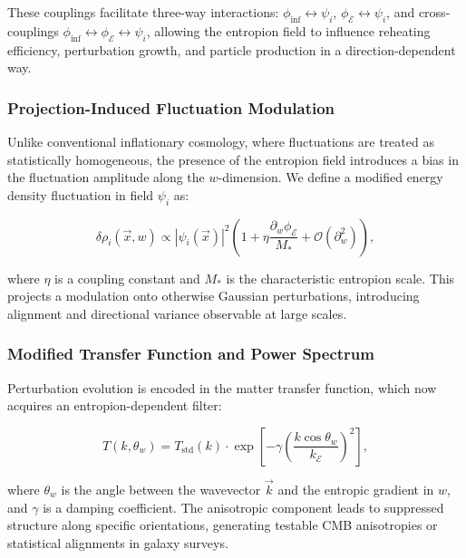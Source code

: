 \documentclass[12pt]{article}
\begin{document}
These couplings facilitate three-way interactions: \(\phi_{\text{inf}} \leftrightarrow \psi_i\), \(\phi_{\mathcal{E}} \leftrightarrow \psi_i\), and cross-couplings \(\phi_{\text{inf}} \leftrightarrow \phi_{\mathcal{E}} \leftrightarrow \psi_i\), allowing the entropion field to influence reheating efficiency, perturbation growth, and particle production in a direction-dependent way.

\subsubsection*{Projection-Induced Fluctuation Modulation}

Unlike conventional inflationary cosmology, where fluctuations are treated as statistically homogeneous, the presence of the entropion field introduces a bias in the fluctuation amplitude along the \(w\)-dimension. We define a modified energy density fluctuation in field \(\psi_i\) as:

\begin{equation}
\label{eq:fluctuation_bias}
\delta \rho_i(\vec{x}, w) \propto \left| \psi_i(\vec{x}) \right|^2 \left( 1 + \eta \frac{\partial_w \phi_{\mathcal{E}}}{M_*} + \mathcal{O}(\partial_w^2) \right),
\end{equation}

where \(\eta\) is a coupling constant and \(M_*\) is the characteristic entropion scale. This projects a modulation onto otherwise Gaussian perturbations, introducing alignment and directional variance observable at large scales.

\subsubsection*{Modified Transfer Function and Power Spectrum}

Perturbation evolution is encoded in the matter transfer function, which now acquires an entropion-dependent filter:

\begin{equation}
\label{eq:transfer_function_mod}
T(k, \theta_w) = T_{\text{std}}(k) \cdot \exp \left[ -\gamma \left( \frac{k \cos \theta_w}{k_{\mathcal{E}}} \right)^2 \right],
\end{equation}

where \(\theta_w\) is the angle between the wavevector \(\vec{k}\) and the entropic gradient in \(w\), and \(\gamma\) is a damping coefficient. The anisotropic component leads to suppressed structure along specific orientations, generating testable CMB anisotropies or statistical alignments in galaxy surveys.
\end{document}
